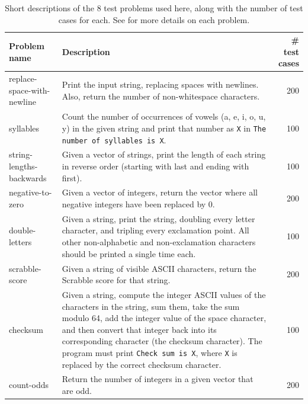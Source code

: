 \begin{table}
	\caption{Short descriptions of the 8 test problems used here, along with the number of test cases
		for each. See \cite{Helmuth:2015:GECCO} for more details on each problem.}
	\label{tab:problems}
	\begin{tabular}{lp{6.5cm}r}
		Problem name \quad & Description \quad & \# test cases \\
		\hline
		replace-space-with-newline & Print the input string, replacing spaces with newlines. Also, return the number of non-whitespace characters. & 200 \\
		syllables & Count the number of occurrences of vowels (a, e, i, o, u, y) in the given string and print that number as \texttt{X} in \texttt{The number of syllables is X}. & 100 \\
		string-lengths-backwards & Given a vector of strings, print the length of each string in reverse order (starting with last and ending with first). & 100 \\
		negative-to-zero & Given a vector of integers, return the vector where all negative integers have been replaced by 0. & 200 \\
		double-letters & Given a string, print the string, doubling every letter character, and tripling every exclamation point. All other non-alphabetic and non-exclamation characters should be printed a single time each. & 100 \\
		scrabble-score & Given a string of visible ASCII characters, return the Scrabble score for that string. & 200 \\
		checksum & Given a string, compute the integer ASCII values of the characters in the string, sum them, take the sum modulo 64, add the integer value of the space character, and then convert that integer back into its corresponding character (the checksum character). The program must print \texttt{Check sum is X}, where \texttt{X} is replaced by the correct checksum character. & 100 \\
		count-odds & Return the number of integers in a given vector that are odd. & 200
	\end{tabular}
\end{table}

